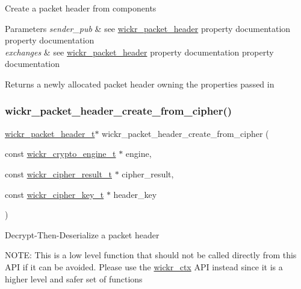 Create a packet header from components


\begin{DoxyParams}{Parameters}
{\em sender\+\_\+pub} & see \textquotesingle{}\hyperlink{structwickr__packet__header}{wickr\+\_\+packet\+\_\+header}\textquotesingle{} property documentation property documentation \\
\hline
{\em exchanges} & see \textquotesingle{}\hyperlink{structwickr__packet__header}{wickr\+\_\+packet\+\_\+header}\textquotesingle{} property documentation property documentation \\
\hline
\end{DoxyParams}
\begin{DoxyReturn}{Returns}
a newly allocated packet header owning the properties passed in 
\end{DoxyReturn}
\mbox{\label{group__wickr__protocol_ga53ff33471ac0c4c7e3feedfcce520639}} 
\subsubsection{\texorpdfstring{wickr\+\_\+packet\+\_\+header\+\_\+create\+\_\+from\+\_\+cipher()}{wickr\_packet\_header\_create\_from\_cipher()}}
{\footnotesize\ttfamily \hyperlink{structwickr__packet__header}{wickr\+\_\+packet\+\_\+header\+\_\+t}$\ast$ wickr\+\_\+packet\+\_\+header\+\_\+create\+\_\+from\+\_\+cipher (\begin{DoxyParamCaption}\item[{const \hyperlink{structwickr__crypto__engine}{wickr\+\_\+crypto\+\_\+engine\+\_\+t} $\ast$}]{engine,  }\item[{const \hyperlink{structwickr__cipher__result}{wickr\+\_\+cipher\+\_\+result\+\_\+t} $\ast$}]{cipher\+\_\+result,  }\item[{const \hyperlink{structwickr__cipher__key}{wickr\+\_\+cipher\+\_\+key\+\_\+t} $\ast$}]{header\+\_\+key }\end{DoxyParamCaption})}

Decrypt-\/\+Then-\/\+Deserialize a packet header

N\+O\+TE\+: This is a low level function that should not be called directly from this A\+PI if it can be avoided. Please use the \textquotesingle{}\hyperlink{structwickr__ctx}{wickr\+\_\+ctx}\textquotesingle{} A\+PI instead since it is a higher level and safer set of functions


